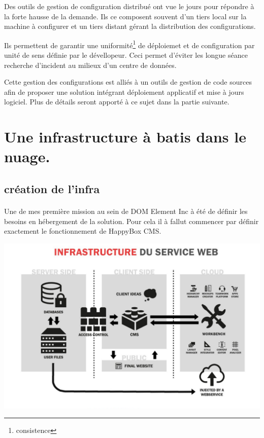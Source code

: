 \documentclass[11pt, a4paper ]{article}
\let\stdsection\section
\renewcommand\section{\newpage\stdsection}
\begin{document}
\begin{spacing}{1.5}
Des outils de gestion de configuration distribué ont vue le jours pour répondre à la forte hausse de la demande. Ils ce composent souvent d'un tiers local sur la machine à configurer et un tiers distant gérant la distribution des configurations.

Ils permettent de garantir une uniformité\footnote{consistence} de déploiemet et de configuration par unité de sens définie par le dévellopeur. Ceci permet d'éviter les longue séance recherche d'incident au milieux d'un centre de données.

Cette gestion des configurations est alliés à un outils de gestion de code sources afin de proposer une solution intégrant déploiement applicatif et mise à jours logiciel. Plus de détails seront apporté à ce sujet dans la partie suivante.


\section{Une infrastructure à batis dans le nuage.}	 %


	\subsection{création de l'infra} %

\paragraph{}
Une de mes première mission au sein de DOM Element Inc à été de définir les besoins en hébergement de la solution. Pour cela il à fallut commencer par définir exactement le fonctionnement de HappyBox CMS.

\begin{center}
	\includegraphics[width=\textwidth]{images/media/fonctionnementHB.png}
\end{center}

\end{spacing}
\end{document}
